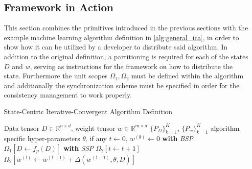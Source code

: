 \subsection{Framework in Action}
This section combines the primitives introduced in the previous sections with the example machine learning algorithm definition in \eqref{alg:general_ica}, in order to show how it can be utilized by a developer to distribute said algorithm.
In addition to the original definition, a partitioning is required for each of the states $D$ and $w$, serving as instructions for the framework on how to distribute the state.
Furthermore the unit scopes $\Omega_1, \Omega_2$ must be defined within the algorithm and additionally the synchronization scheme must be specified in order for the consistency management to work properly.
\begin{algorithm}
\caption{State-Centric Iterative-Convergent Algorithm Definition}\label{alg:scpm_ica}
\begin{algorithmic}[1]{}
\ALGSTATE Data tensor $D \in \mathbb{R}^{n \times d}$, weight tensor $w \in \mathbb{R}^{m \times d}$
\PARTITIONING $\{P_D\}_{k=1}^K$, $\{P_w\}_{k=1}^K$
\INPUT algorithm specific hyper-parameters $\theta$, if any
\INIT $t \gets 0$, $w^{(0)} \gets 0$
\State \textbf{with} \textit{BSP}
\State \hspace{\algorithmicindent} $\Omega_1[D \gets f_{p}(D)]$
\Repeat
\State \textbf{with} \textit{SSP}
\State \hspace{\algorithmicindent} $\Omega_2[t \gets t + 1]$
\State \hspace{\algorithmicindent} $\Omega_2[w^{(t)} \gets w^{(t-1)} + \Delta(w^{(t-1)}, \theta, D)]$
\end{algorithmic}
\end{algorithm}


